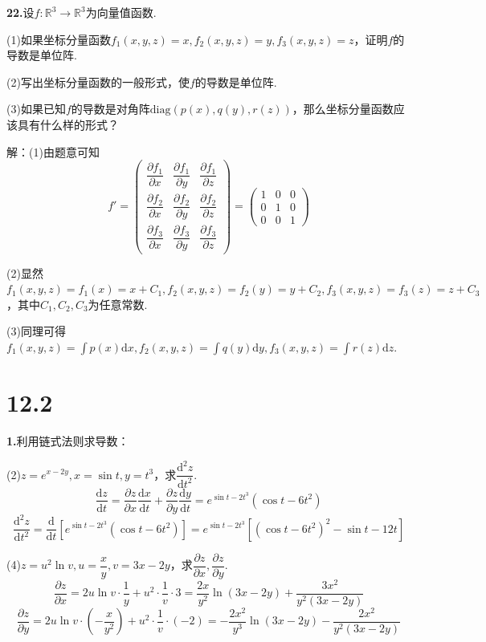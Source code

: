 \documentclass[12pt, a4paper]{article}
\newcommand{\RR}{\mathbb{R}}
\newcommand{\dif}{\mathrm{d}}
\begin{document}
\textbf{22.}设\(f: \RR^3 \rightarrow \RR^3\)为向量值函数.

(1)如果坐标分量函数\(f_1(x, y, z) = x, f_2(x, y, z) = y, f_3(x, y, z) = z\)，证明\(f\)的导数是单位阵.

(2)写出坐标分量函数的一般形式，使\(f\)的导数是单位阵.

(3)如果已知\(f\)的导数是对角阵\(\mathrm{diag}(p(x), q(y), r(z))\)，那么坐标分量函数应该具有什么样的形式？

解：(1)由题意可知
\[f' = \begin{pmatrix} \dfrac{\partial f_1}{\partial x} & \dfrac{\partial f_1}{\partial y} & \dfrac{\partial f_1}{\partial z} \\ \dfrac{\partial f_2}{\partial x} & \dfrac{\partial f_2}{\partial y} & \dfrac{\partial f_2}{\partial z} \\ \dfrac{\partial f_3}{\partial x} & \dfrac{\partial f_3}{\partial y} & \dfrac{\partial f_3}{\partial z} \end{pmatrix} = \begin{pmatrix} 1 & 0 & 0 \\ 0 & 1 & 0 \\ 0 & 0 & 1 \end{pmatrix}\]

(2)显然\(f_1(x, y, z) = f_1(x) = x + C_1, f_2(x, y, z) = f_2(y) = y + C_2, f_3(x, y, z) = f_3(z) = z + C_3\)，其中\(C_1, C_2, C_3\)为任意常数.

(3)同理可得\(f_1(x, y, z) = \int p(x) \dif x, f_2(x, y, z) = \int q(y) \dif y, f_3(x, y, z) = \int r(z) \dif z\).

\section*{12.2}
\textbf{1.}利用链式法则求导数：

(2)\(z = e^{x - 2y}, x = \sin t, y = t^3\)，求\(\dfrac{\dif^2 z}{\dif t^2}\).
\[\frac{\dif z}{\dif t} = \frac{\partial z}{\partial x} \frac{\dif x}{\dif t} + \frac{\partial z}{\partial y} \frac{\dif y}{\dif t} = e^{\sin t - 2t^3}(\cos t - 6t^2)\]
\[\frac{\dif^2 z}{\dif t^2} = \frac{\dif}{\dif t}\left[e^{\sin t - 2t^3}(\cos t - 6t^2)\right] = e^{\sin t - 2t^3}[(\cos t - 6t^2)^2 - \sin t - 12t]\]

(4)\(z = u^2 \ln v, u = \dfrac{x}{y}, v = 3x - 2y\)，求\(\dfrac{\partial z}{\partial x}, \dfrac{\partial z}{\partial y}\).
\[\frac{\partial z}{\partial x} = 2u \ln v \cdot \frac{1}{y} + u^2 \cdot \frac{1}{v} \cdot 3 = \frac{2x}{y^2} \ln(3x - 2y) + \frac{3x^2}{y^2(3x - 2y)}\]
\[\frac{\partial z}{\partial y} = 2u \ln v \cdot \left(-\frac{x}{y^2}\right) + u^2 \cdot \frac{1}{v} \cdot (-2) = -\frac{2x^2}{y^3} \ln(3x - 2y) - \frac{2x^2}{y^2(3x - 2y)}\]
\end{document}
